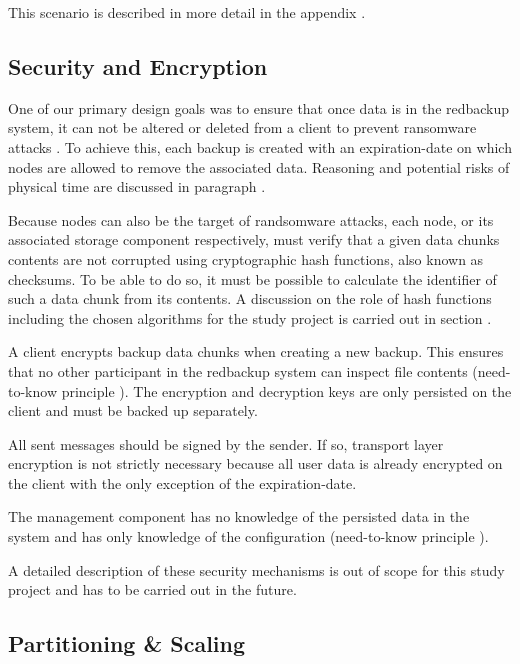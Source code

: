 This scenario is described in more detail in the appendix .

\subsection{Security and Encryption}\label{sec:security-and-encryption}
One of our primary design goals was to ensure that once data is in the redbackup system, it can not be altered or deleted from a \gls{client} to prevent ransomware attacks \cite{young-cryptovirology}. To achieve this, each backup is created with an \gls{expiration-date} on which \glspl{node} are allowed to remove the associated data. Reasoning and potential risks of physical time are discussed in paragraph .

Because \glspl{node} can also be the target of randsomware attacks, each \gls{node}, or its associated \gls{storage} component respectively, must verify that a given data \gls{chunk}s contents are not corrupted using cryptographic hash functions, also known as checksums. To be able to do so, it must be possible to calculate the identifier of such a data \gls{chunk} from its contents. A discussion on the role of hash functions including the chosen algorithms for the study project is carried out in section .

A \gls{client} encrypts backup data \glspl{chunk} when creating a new backup. This ensures that no other participant in the redbackup system can inspect file contents (need-to-know principle \cite{security-patterns}). The encryption and decryption keys are only persisted on the client and must be backed up separately.

All sent \glspl{message} should be signed by the sender. If so, transport layer encryption is not strictly necessary because all user data is already encrypted on the \gls{client} with the only exception of the \gls{expiration-date}.

The \gls{management} component has no knowledge of the persisted data in the system and has only knowledge of the configuration (need-to-know principle \cite{security-patterns}).

A detailed description of these security mechanisms is out of scope for this study project and has to be carried out in the future.

\subsection{Partitioning \& Scaling}

